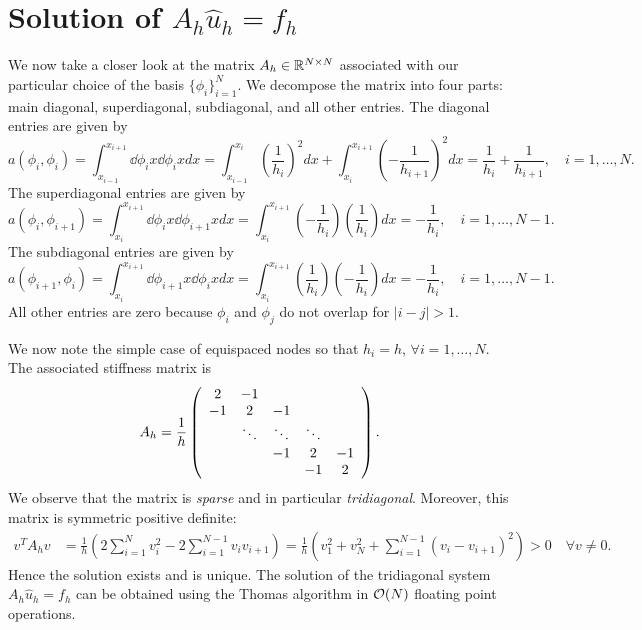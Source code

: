 \section{Solution of $A_h \hat u_h = f_h$}

We now take a closer look at the matrix $A_h \in \RR^{N \times N}$ associated with our particular choice of the basis $\{\phi_i\}_{i=1}^N$.  We decompose the matrix into four parts: main diagonal, superdiagonal, subdiagonal, and all other entries.  The diagonal entries are given by 
\begin{equation*}
  a(\phi_i,\phi_i) = \int_{x_{i-1}}^{x_{i+1}} \dd{\phi_i}{x} \dd{\phi_i}{x} dx
  = \int_{x_{i-1}}^{x_{i}} \left( \frac{1}{h_i} \right)^2 dx +
  \int_{x_{i}}^{x_{i+1}} \left( - \frac{1}{h_{i+1}} \right)^2 dx
  = \frac{1}{h_i} + \frac{1}{h_{i+1}}, \quad i = 1,\dots,N.
\end{equation*}
The superdiagonal entries are given by
\begin{equation*}
  a(\phi_i,\phi_{i+1}) =
  \int_{x_i}^{x_{i+1}} \dd{\phi_i}{x} \dd{\phi_{i+1}}{x} dx
  = \int_{x_i}^{x_{i+1}} \left( - \frac{1}{h_i} \right) \left( \frac{1}{h_i} \right) dx
  = - \frac{1}{h_i}, \quad i = 1,\dots,N-1.
\end{equation*}
The subdiagonal entries are given by
\begin{equation*}
  a(\phi_{i+1},\phi_i) =
  \int_{x_i}^{x_{i+1}} \dd{\phi_{i+1}}{x} \dd{\phi_i}{x} dx
  = \int_{x_i}^{x_{i+1}}  \left( \frac{1}{h_i} \right) \left( - \frac{1}{h_i} \right) dx
  = - \frac{1}{h_i}, \quad i = 1,\dots,N-1.
\end{equation*}
All other entries are zero because $\phi_i$ and $\phi_j$ do not overlap for $|i -j| > 1$.

We now note the simple case of equispaced nodes so that $h_i = h$, $\forall i = 1,\dots,N$.  The associated stiffness matrix is
\begin{equation*}
  A_h = \frac{1}{h} \bmat{ccccc} 2 & -1 \\ -1 & 2 & -1 \\ & \ddots & \ddots & \ddots \\ & &-1 & 2 & -1 \\ &&& -1 & 2 \emat.
\end{equation*}
We observe that the matrix is \emph{sparse} and in particular \emph{tridiagonal}.  Moreover, this matrix is symmetric positive definite:
\begin{align*}
  v^T A_h v
  &=
  \frac{1}{h} \left(
  2\sum_{i=1}^N v_i^2 - 2\sum_{i=1}^{N-1} v_iv_{i+1} 
  \right)
  =
  \frac{1}{h} \left(
  v_1^2 + v_{N}^2 + \sum_{i=1}^{N-1} (v_i - v_{i+1})^2 
  \right)
  > 0 \quad \forall v \neq 0.
\end{align*}
Hence the solution exists and is unique.  The solution of the tridiagonal system $A_h \hat u_h = f_h$ can be obtained using the Thomas algorithm in $\calO(N)$ floating point operations.

